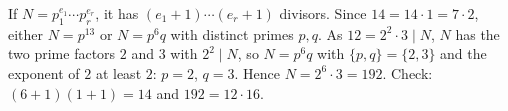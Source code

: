 If $N=p_1^{e_1}\cdots p_r^{e_r}$, it has $(e_1+1)\cdots(e_r+1)$ divisors. Since $14=14\cdot1=7\cdot2$, either $N=p^{13}$ or $N=p^6q$ with distinct primes $p,q$. As $12=2^2\cdot3\mid N$, $N$ has the two prime factors $2$ and $3$ with $2^2\mid N$, so $N=p^6q$ with $\{p,q\}=\{2,3\}$ and the exponent of $2$ at least $2$: $p=2$, $q=3$. Hence $N=2^6\cdot3=\boxed{192}$. Check: $(6+1)(1+1)=14$ and $192=12\cdot16$.
